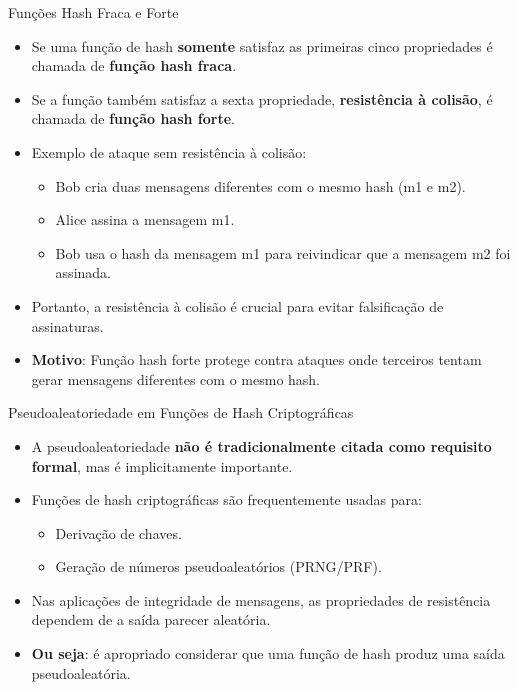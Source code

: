 \begin{frame}{Funções Hash Fraca e Forte}
    \begin{itemize}
        \item Se uma função de hash \textbf{somente} satisfaz as primeiras cinco propriedades é chamada de \textbf{função hash fraca}.
        \item Se a função também satisfaz a sexta propriedade, \textbf{resistência à colisão}, é chamada de \textbf{função hash forte}.

        \item Exemplo de ataque sem resistência à colisão:
              \begin{itemize}
                  \item Bob cria duas mensagens diferentes com o mesmo hash (m1 e m2).
                  \item Alice assina a mensagem m1.
                  \item Bob usa o hash da mensagem m1 para reivindicar que a mensagem m2 foi assinada.
              \end{itemize}
        \item Portanto, a resistência à colisão é crucial para evitar falsificação de assinaturas.
        \item \textbf{Motivo}: Função hash forte protege contra ataques onde terceiros tentam gerar mensagens diferentes com o mesmo hash.
    \end{itemize}
\end{frame}

\begin{frame}{Pseudoaleatoriedade em Funções de Hash Criptográficas}
    \begin{itemize}
        \item A pseudoaleatoriedade \textbf{não é tradicionalmente citada como requisito formal}, mas é implicitamente importante.
        \item Funções de hash criptográficas são frequentemente usadas para:
              \begin{itemize}
                  \item Derivação de chaves.
                  \item Geração de números pseudoaleatórios (PRNG/PRF).
              \end{itemize}
        \item Nas aplicações de integridade de mensagens, as propriedades de resistência dependem de a saída parecer aleatória.
        \item \textbf{Ou seja}: é apropriado considerar que uma função de hash produz uma saída pseudoaleatória.
    \end{itemize}
\end{frame}

